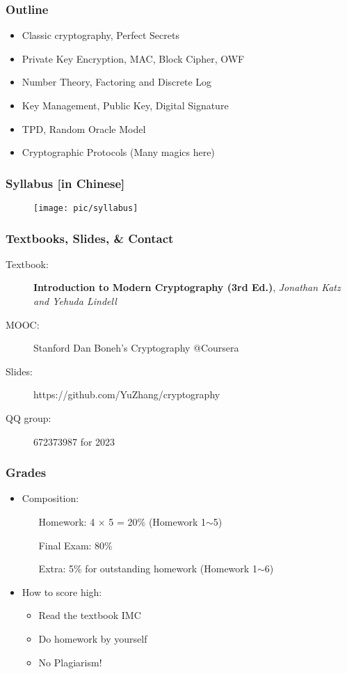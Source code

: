 \begin{frame}\frametitle{Outline}
\begin{itemize}
\item Classic cryptography, Perfect Secrets
\item Private Key Encryption, MAC, Block Cipher, OWF
\item Number Theory, Factoring and Discrete Log
\item Key Management, Public Key, Digital Signature
\item TPD, Random Oracle Model
\item Cryptographic Protocols (Many magics here)
\end{itemize}
\end{frame}
\begin{frame}\frametitle{Syllabus [in Chinese]}
\begin{figure}
\begin{center}
\texttt{[image: pic/syllabus]} 
\end{center}
\end{figure}
\end{frame}
\begin{frame}\frametitle{Textbooks, Slides, \& Contact}
\begin{description} 
\item[Textbook:] \textbf{Introduction to Modern Cryptography (3rd Ed.)}, \emph{Jonathan Katz and Yehuda Lindell} %
\item[MOOC:] Stanford Dan Boneh's Cryptography @Coursera
\item[Slides:] https://github.com/YuZhang/cryptography
\item[QQ group:] 672373987 for 2023
\end{description}
\end{frame}
\begin{frame}\frametitle{Grades}
\begin{itemize}
\item Composition:
\begin{itemize}
\item[Homework:] 4 $\times$ 5 = 20\% (Homework 1$\sim$5)
\item[Final Exam:] 80\%
\item[Extra:]  5\% for outstanding homework (Homework 1$\sim$6)
\end{itemize}
\item How to score high:
\begin{itemize}
\item Read the textbook IMC
\item Do homework by yourself
\item \alert{No Plagiarism!} 
\end{itemize}
\end{itemize}
\end{frame}

